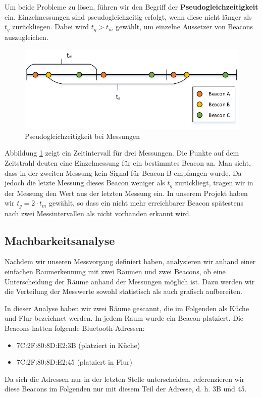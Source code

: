 Um beide Probleme zu lösen, führen wir den Begriff der \textbf{Pseudogleichzeitigkeit} ein.
Einzelmessungen sind pseudogleichzeitig erfolgt, wenn diese nicht länger als 
$t_g$ zurückliegen. Dabei wird $t_g > t_m$ gewählt, um einzelne Aussetzer von Beacons
auszugleichen.

\begin{figure}[tbh]
\centering
\includegraphics[width=1.0\linewidth]{Bilder/Lok-Messung}
\caption{Pseudogleichzeitigkeit bei Messungen}
\label{fig:Lok-Messung}
\end{figure}

Abbildung \ref{fig:Lok-Messung} zeigt ein Zeitintervall für drei Messungen. Die
Punkte auf dem Zeitstrahl deuten eine Einzelmessung für ein bestimmtes Beacon
an.
Man sieht, dass in der zweiten Messung kein Signal für Beacon B empfangen wurde.
Da jedoch die letzte Messung dieses Beacon weniger als $t_g$ zurückliegt, tragen
wir in der Messung den Wert aus der letzten Messung ein.
In unserem Projekt haben wir $t_g = 2 \cdot t_m$ gewählt, so dass ein nicht mehr
erreichbarer Beacon spätestens nach zwei Messintervallen als nicht vorhanden
erkannt wird.

\subsection{Machbarkeitsanalyse}

Nachdem wir unseren Messvorgang definiert haben, analysieren wir anhand
einer einfachen Raumerkennung mit zwei Räumen und zwei Beacons, ob eine
Unterscheidung der Räume anhand der Messungen möglich ist.
Dazu werden wir die Verteilung der Messwerte sowohl statistisch als
auch grafisch aufbereiten.

In dieser Analyse haben wir zwei Räume gescannt, die im Folgenden als
Küche und Flur bezeichnet werden. In jedem Raum wurde ein Beacon platziert.
Die Beacons hatten folgende Bluetooth-Adressen:
\begin{itemize}
	\item 7C:2F:80:8D:E2:3B (platziert in Küche)
	\item 7C:2F:80:8D:E2:45 (platziert in Flur)
\end{itemize}
Da sich die Adressen nur in der letzten Stelle unterscheiden, referenzieren
wir diese Beacons im Folgenden nur mit diesem Teil der Adresse, d. h.
3B und 45.

